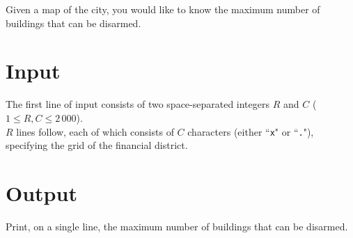 Given a map of the city, you would like to know the maximum number of buildings that can be disarmed.

\section*{Input}
The first line of input consists of two space-separated integers $R$ and $C$ ($1 \le R, C \le 2\,000$).\\
$R$ lines follow, each of which consists of $C$ characters (either ``\texttt{x}" or ``\texttt{.}"), specifying the grid of the financial district.

\section*{Output}
Print, on a single line, the maximum number of buildings that can be disarmed.\\
